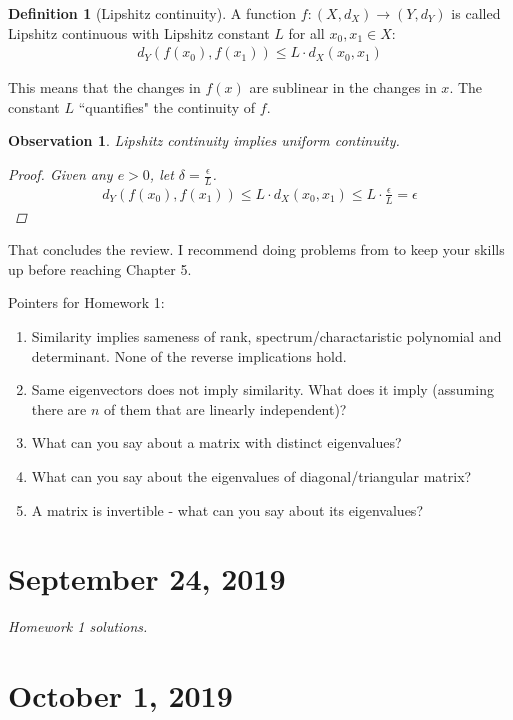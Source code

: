 \documentclass[11pt]{article}
\newcommand{\e}{\epsilon}
\theoremstyle{plain}
\newtheorem{obs}{Observation}[section]
\theoremstyle{definition}
\newtheorem{defi}{Definition}[section]
\theoremstyle{remark}
\begin{document}
\begin{defi}[Lipshitz continuity]
    A function $f: (X,d_X) \rightarrow (Y, d_Y)$ is called Lipshitz continuous with Lipshitz constant $L$ for all $x_0, x_1 \in X$:
    \begin{align*}
        d_Y(f(x_0), f(x_1)) \leq L \cdot d_X(x_0, x_1)
    \end{align*}
\end{defi}
This means that the changes in $f(x)$ are sublinear in the changes in $x$. The constant $L$ ``quantifies" the continuity of $f$. 
\begin{obs}
    Lipshitz continuity implies uniform continuity.
    \begin{proof}
        Given any $e > 0$, let $\delta = \frac{\e}{L}$.
        \begin{align*}
            d_Y(f(x_0), f(x_1)) \leq L \cdot d_X(x_0, x_1) \leq L \cdot \frac{\e}{L} = \e
        \end{align*}
    \end{proof}
\end{obs}

That concludes the review. I recommend doing problems from \citet{aksoy} to keep your skills up before reaching Chapter 5.

Pointers for Homework 1:
\begin{enumerate}
        \item Similarity implies sameness of rank, spectrum/charactaristic polynomial and determinant. None of the reverse implications hold.
        \item Same eigenvectors does not imply similarity. What does it imply (assuming there are $n$ of them that are linearly independent)?
        \item What can you say about a matrix with distinct eigenvalues?
        \item What can you say about the eigenvalues of diagonal/triangular matrix?
        \item A matrix is invertible - what can you say about its eigenvalues?
\end{enumerate}

\section{September 24, 2019}

{\it Homework 1 solutions.}

\section{October 1, 2019}
\end{document}
